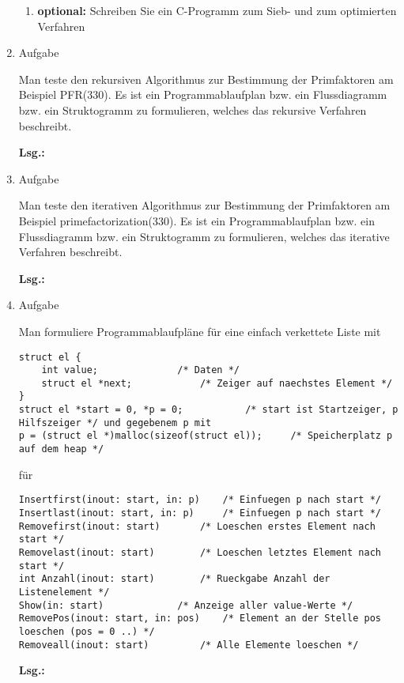 \documentclass[12pt,a4paper,ngerman]{scrreprt}
\newcommand{\Lsg}{\par \textbf{Lsg.: \hfill }}
\begin{document}
\begin{enumerate}
\begin{enumerate}
\item \textbf{optional:} Schreiben Sie ein C-Programm zum Sieb- und zum optimierten Verfahren
\end{enumerate}

\item Aufgabe %

Man teste den rekursiven Algorithmus zur Bestimmung der Primfaktoren am
Beispiel PFR(330). Es ist ein Programmablaufplan bzw. ein Flussdiagramm bzw. ein Struktogramm zu formulieren, welches das rekursive Verfahren beschreibt.

\Lsg

\item Aufgabe %

Man teste den iterativen Algorithmus zur Bestimmung der Primfaktoren am
Beispiel primefactorization(330). Es ist ein Programmablaufplan bzw. ein Flussdiagramm bzw. ein Struktogramm zu formulieren, welches das iterative Verfahren beschreibt.

\Lsg

\item Aufgabe %

Man formuliere Programmablaufpläne für eine einfach verkettete Liste mit

\begin{lstlisting}
struct el {
	int value;				/* Daten */
	struct el *next;			/* Zeiger auf naechstes Element */
}
struct el *start = 0, *p = 0;			/* start ist Startzeiger, p Hilfszeiger */ und gegebenem p mit
p = (struct el *)malloc(sizeof(struct el)); 	/* Speicherplatz p auf dem heap */
\end{lstlisting}

für

\begin{lstlisting}
Insertfirst(inout: start, in: p)	/* Einfuegen p nach start */
Insertlast(inout: start, in: p)		/* Einfuegen p nach start */
Removefirst(inout: start)		/* Loeschen erstes Element nach start */
Removelast(inout: start)		/* Loeschen letztes Element nach start */
int Anzahl(inout: start)		/* Rueckgabe Anzahl der Listenelement */
Show(in: start)				/* Anzeige aller value-Werte */
RemovePos(inout: start, in: pos)	/* Element an der Stelle pos loeschen (pos = 0 ..) */
Removeall(inout: start)			/* Alle Elemente loeschen */
\end{lstlisting}

\Lsg


\end{enumerate}
\end{document}
